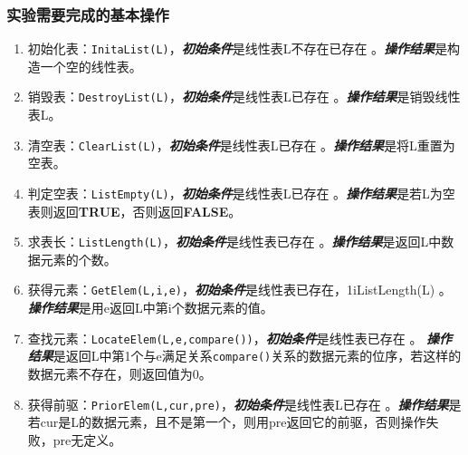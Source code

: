 \documentclass[format=draft,language=chinese,category=academic-report]{hustreport}
\begin{document}
\subsubsection{实验需要完成的基本操作}
\begin{enumerate}
\item 初始化表：\texttt{InitaList(L)}，\newline \textbf{\emph{初始条件}}是线性表L不存在已存在 。\newline \textbf{\emph{操作结果}}是构造一个空的线性表。
\item 销毁表：\texttt{DestroyList(L)}，\newline \textbf{\emph{初始条件}}是线性表L已存在 。\newline \textbf{\emph{操作结果}}是销毁线性表L。
\item 清空表：\texttt{ClearList(L)}，\newline \textbf{\emph{初始条件}}是线性表L已存在 。\newline \textbf{\emph{操作结果}}是将L重置为空表。
\item 判定空表：\texttt{ListEmpty(L)}，\newline \textbf{\emph{初始条件}}是线性表L已存在 。\newline \textbf{\emph{操作结果}}是若L为空表则返回\textbf{TRUE}，否则返回\textbf{FALSE}。
\item 求表长：\texttt{ListLength(L)}，\newline \textbf{\emph{初始条件}}是线性表已存在 。\newline \textbf{\emph{操作结果}}是返回L中数据元素的个数。
\item 获得元素：\texttt{GetElem(L,i,e)}，\newline \textbf{\emph{初始条件}}是线性表已存在，1\le i\le ListLength(L) 。\newline \textbf{\emph{操作结果}}是用e返回L中第i个数据元素的值。
\item 查找元素：\texttt{LocateElem(L,e,compare())}，\newline \textbf{\emph{初始条件}}是线性表已存在 。\newline
    \textbf{\emph{操作结果}}是返回L中第1个与e满足关系\texttt{compare()}关系的数据元素的位序，若这样的数据元素不存在，则返回值为0。
\item 获得前驱：\texttt{PriorElem(L,cur,pre)}，\newline \textbf{\emph{初始条件}}是线性表L已存在 。\newline \textbf{\emph{操作结果}}是若cur是L的数据元素，且不是第一个，则用pre返回它的前驱，否则操作失败，pre无定义。

\end{enumerate}
\end{document}
